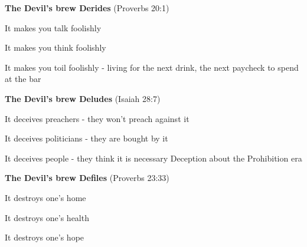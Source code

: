 \begin{compactenum}[I.]
    \item \textbf{The Devil's brew Derides} (Proverbs 20:1)
    \begin{compactenum}[A.]
        \item It makes you talk foolishly
        \item It makes you think foolishly
        \item It makes you toil foolishly - living for the next drink, the next paycheck to spend at the bar
    \end{compactenum}
    \item \textbf{The Devil's brew Deludes} (Isaiah 28:7)
    \begin{compactenum}[A.]
        \item It deceives preachers - they won't preach against it
        \item It deceives politicians - they are bought by it
        \item It deceives people - they think it is necessary {Deception about the Prohibition era}
    \end{compactenum}
    \item \textbf{The Devil's brew Defiles} (Proverbs 23:33)
    \begin{compactenum}[A.]
        \item It destroys one's home
        \item It destroys one's health
        \item It destroys one's hope
    \end{compactenum}
\end{compactenum}


